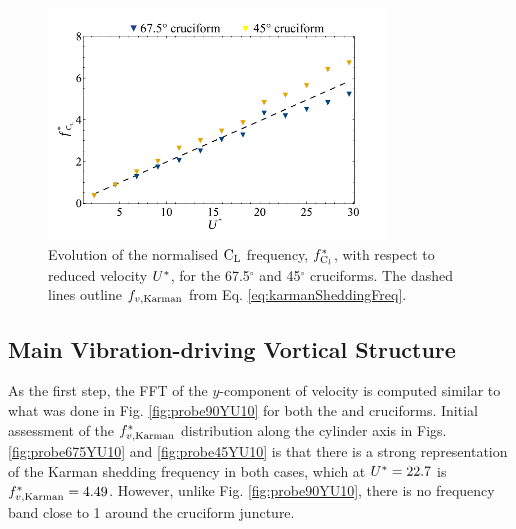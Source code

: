 \documentclass[oneside]{utmthesis}
\begin{document}
\begin{figure}[H]
  \centering
  \includegraphics[width=0.8\textwidth]{figs/clFreq43}
  \caption{Evolution of the normalised $\text{C}_{\text{L}}$ frequency, $f_{\text{C}_{l}}^{*}$, with respect to reduced velocity $U^{*}$, for the 67.5$^{\circ}$ and 45$^{\circ}$ cruciforms. The dashed lines outline $f_{v,\text{Karman}}$ from Eq. \ref{eq:karmanSheddingFreq}.}
  \label{fig:clFreq43}
\end{figure}

\subsection{Main Vibration-driving Vortical Structure}\label{ssec:transitionalRegimeVortStruct}

As the first step, the FFT of the $y$-component of velocity is computed similar to what was done in Fig. \ref{fig:probe90YU10} for both the \angfo{} and \angth{} cruciforms. Initial assessment of the $f^{*}_{v,\text{Karman}}$ distribution along the cylinder axis in Figs. \ref{fig:probe675YU10} and \ref{fig:probe45YU10} is that there is a strong representation of the Karman shedding frequency in both cases, which at $U^{*} = 22.7$ is $f^{*}_{v,\text{Karman}} = 4.49$. However, unlike Fig. \ref{fig:probe90YU10}, there is no frequency band close to 1 around the cruciform juncture.
\end{document}
